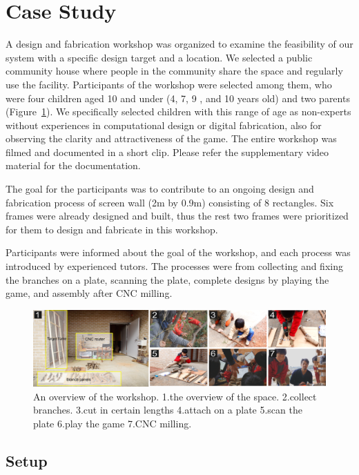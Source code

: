 \section{Case Study}
\label{sec:casestudy}
A design and fabrication workshop was organized to examine the feasibility of our system with a specific design target and a location.
We selected a public community house where people in the community share the space and regularly use the facility.
Participants of the workshop were selected among them, who were four children aged 10 and under (4, 7, 9 , and 10 years old) and two parents (Figure~\ref{fig:workshop}).
We specifically selected children with this range of age as non-experts without experiences in computational design or digital fabrication, also for observing the clarity and attractiveness of the game.
The entire workshop was filmed and documented in a short clip.
Please refer the supplementary video material for the documentation.

The goal for the participants was to contribute to an ongoing design and fabrication process of screen wall (2m by 0.9m) consisting of 8 rectangles.
Six frames were already designed and built, thus the rest two frames were prioritized for them to design and fabricate in this workshop.

Participants were informed about the goal of the workshop, and each process was introduced by experienced tutors.
The processes were from collecting and fixing the branches on a plate, scanning the plate, complete designs by playing the game, and assembly after CNC milling.

\begin{figure}[ht]
  \begin{center}
    \includegraphics[width = 0.4\paperwidth]{images/fabrication/workshop_setup.png}
    \caption{An overview of the workshop. 1.the overview of the space. 2.collect branches. 3.cut in certain lengths 4.attach on a plate 5.scan the plate 6.play the game 7.CNC milling.}
    \label{fig:workshop}
  \end{center}
\end{figure}

\subsection{Setup}
